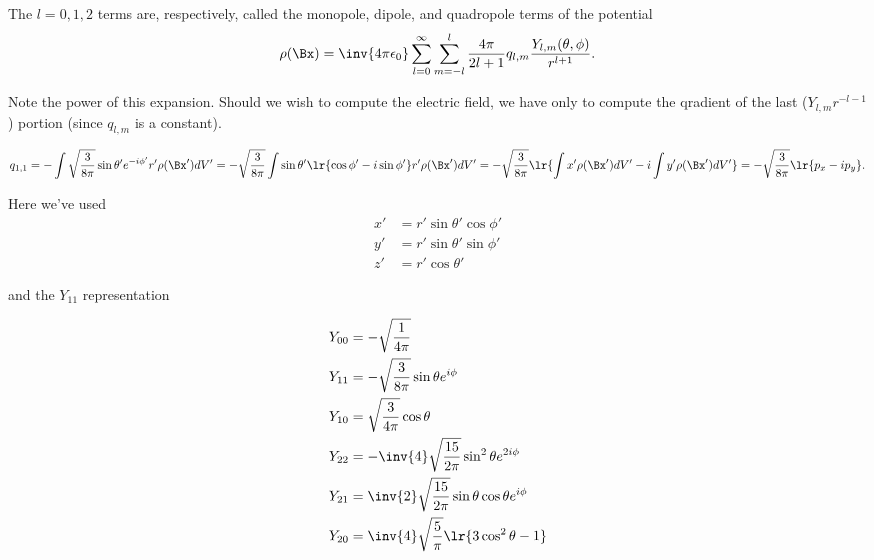 The \( l = 0,1,2\) terms are, respectively, called the monopole, dipole, and quadropole terms of the potential
\begin{dmath}\label{eqn:emtLecture8:500}
\rho(\Bx) =
\inv{4 \pi \epsilon_0}
\sum_{l= 0}^\infty \sum_{m = -l}^l \frac{4\pi} {2 l + 1}
q_{l,m}
\frac{
Y_{l,m}(\theta, \phi)
}
{
r^{l+1}
}.
\end{dmath}

Note the power of this expansion.  Should we wish to compute the electric field, we have only to compute the qradient of  the last (\(Y_{l,m} r^{-l-1} \)) portion (since \( q_{l,m} \) is a constant).

\begin{dmath}\label{eqn:emtLecture8:520}
q_{1,1}
=
-\int \sqrt{\frac{3}{8 \pi}} \sin\theta' e^{-i\phi'} r' \rho(\Bx') dV'
=
-\sqrt{\frac{3}{8 \pi}} \int \sin\theta' \lr{ \cos\phi' - i\sin\phi'} r' \rho(\Bx') dV'
=
-\sqrt{\frac{3}{8 \pi}} \lr{
\int x' \rho(\Bx') dV'
-i \int y' \rho(\Bx') dV'
}
=
-\sqrt{\frac{3}{8 \pi}} \lr{
p_x - i p_y
}.
\end{dmath}

Here we've used
\begin{dmath}\label{eqn:emtLecture8:540}
\begin{aligned}
x' &= r' \sin\theta' \cos\phi' \\
y' &= r' \sin\theta' \sin\phi' \\
z' &= r' \cos\theta'
\end{aligned}
\end{dmath}

and the \( Y_{11} \) representation

\begin{dmath}\label{eqn:emtLecture8:560}
\begin{aligned}
Y_{00} &= -\sqrt{\frac{1}{4 \pi}} \\
Y_{11} &= -\sqrt{\frac{3}{8 \pi}} \sin\theta e^{i\phi} \\
Y_{10} &=  \sqrt{\frac{3}{4 \pi}} \cos\theta  \\
Y_{22} &= -\inv{4} \sqrt{\frac{15}{2 \pi}} \sin^2\theta e^{2 i\phi} \\
Y_{21} &=  \inv{2} \sqrt{\frac{15}{2 \pi}} \sin\theta \cos\theta e^{i\phi} \\
Y_{20} &=  \inv{4} \sqrt{\frac{5}{\pi}} \lr{ 3 \cos^2\theta - 1 } \\
\end{aligned}
\end{dmath}


